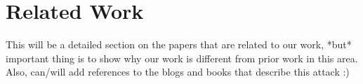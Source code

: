 \chapter{Related Work}
This will be a detailed section on the papers that are related to our work, *but* important thing is to show why our work is different from prior work in this area.
Also, can/will add references to the blogs and books that describe this attack :)